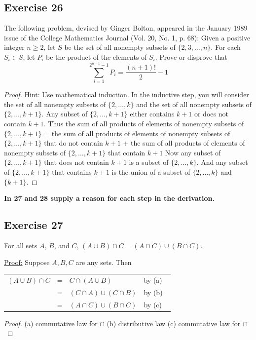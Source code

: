\documentclass[14pt]{extarticle}
\newcommand{\fbl}{\underline{\hspace{1cm}}\,\,}
\newcommand{\cy}{\color{cyan}}
\begin{document}
\subsection{Exercise 26}
The following problem, devised by Ginger Bolton, appeared in the January 1989 issue of the College Mathematics Journal (Vol. 20, No. 1, p. 68): Given a positive integer $n \geq 2$, let $S$ be the set of all nonempty subsets of \(\{2, 3, \ldots, n\}\). For each \(S_i \in S\), let $P_i$ be the product of the elements of $S_i$. Prove or disprove that
\[
\sum_{i=1}^{2^{n-1}-1} P_i = \frac{(n+1)!}{2} - 1
\]
\begin{proof}
Hint: Use mathematical induction. In the inductive step, you will consider the set of all nonempty subsets of 
\(\{2, \ldots, k\}\) and the set of all nonempty subsets of \(\{2, \ldots, k + 1\}\). Any subset of 
\(\{2, \ldots, k + 1\}\) either contains \(k + 1\) or does not contain \(k + 1\). Thus the sum of all products of 
elements of nonempty subsets of \(\{2, \ldots , k + 1\}\) = the sum of all products of elements of nonempty subsets of 
\(\{2, \ldots, k + 1\}\) that do not contain \(k + 1\) + the sum of all products of elements of nonempty subsets of 
\(\{2, \ldots, k + 1\}\) that contain \(k + 1\) Now any subset of \(\{2, \ldots, k + 1\}\) that does not contain 
\(k + 1\) is a subset of \(\{2, \ldots, k\}\). And any subset of \(\{2, \ldots, k + 1\}\) that contains \(k + 1\) 
is the union of a subset of \(\{2, \ldots, k\}\) and \(\{k + 1\}\).
\end{proof}

{\bf \cy In 27 and 28 supply a reason for each step in the derivation.}

\subsection{Exercise 27}
For all sets $A$, $B$, and $C$, \((A \cup B) \cap C = (A \cap C) \cup (B \cap C)\).

\underline{Proof:} Suppose $A,B,C$ are any sets. Then

\begin{tabular}{rcll}
\((A \cup B) \cap C\) & = & \(C \cap (A \cup B)\) & by (a) \fbl \\
& = & \((C \cap A) \cup (C \cap B)\) & by (b) \fbl \\
& = & \((A \cap C) \cup (B \cap C)\) & by (c) \fbl 
\end{tabular}

\begin{proof}
(a) commutative law for $\cap$ (b) distributive law (c) commutative law for $\cap$
\end{proof}
\end{document}
